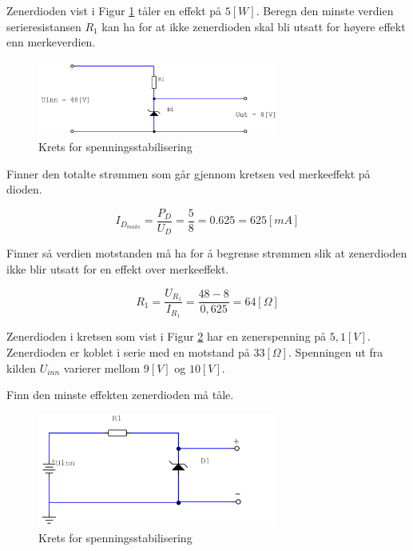 \begin{question}[name=Oppgave, topic=zenerdioder]
Zenerdioden vist i Figur \ref{fig:zenKrets3} tåler en effekt på $5 [W]$. Beregn den minste verdien serieresistansen $R_1$ kan ha for at ikke zenerdioden skal bli utsatt for høyere effekt enn merkeverdien.
\begin{figure}[H]
	\centering
	\includegraphics[width=0.7\textwidth]{diode/figurer/zenKrets3.png}
	\caption{Krets for spenningsstabilisering}
	\label{fig:zenKrets3}
\end{figure}	
\end{question}

\vspace{0.5cm} %

\begin{solution}[name=Løsningsforslag oppgave]
Finner den totalte strømmen som går gjennom kretsen ved merkeeffekt på dioden.

\[I_{D_{maks}} = \frac{P_D}{U_D} = \frac{5}{8} = 0.625 = 625 [mA]\]


Finner så verdien motstanden må ha for å begrense strømmen slik at zenerdioden ikke blir utsatt for en effekt over merkeeffekt.


\[R_1 = \frac{U_{R_1}}{I_{R_1}}= \frac{48-8}{0,625}= 64 [\Omega]\]
\end{solution}



\begin{question}[name=Oppgave, topic=zenerdioder]
Zenerdioden i kretsen som vist i Figur \ref{fig:zenKrets4} har en zenerspenning på $5,1 [V]$. Zenerdioden er koblet i serie med en motstand på $33 [\Omega]$. Spenningen ut fra kilden $U_{inn}$ varierer mellom $9[V]$ og $10 [V]$.

Finn den minste effekten zenerdioden må tåle.
\begin{figure}[H]
	\centering
	\includegraphics[width=0.7\textwidth]{diode/figurer/zenKrets4.png}
	\caption{Krets for spenningsstabilisering}
	\label{fig:zenKrets4}
\end{figure}	

\end{question}

